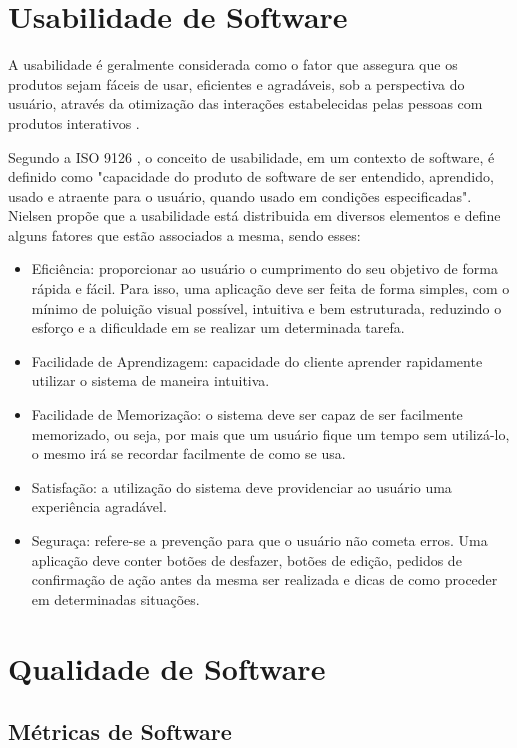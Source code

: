 \section{Usabilidade de Software}
A usabilidade é geralmente considerada como o fator que assegura que
os produtos sejam fáceis de usar, eficientes e agradáveis, sob a
perspectiva do usuário, através da otimização das interações
estabelecidas pelas pessoas com produtos interativos \cite{rogers_2013}.

Segundo a ISO 9126 \cite{iso9126}, o conceito de usabilidade, em um contexto de software, é definido como "capacidade do produto de software de ser entendido, aprendido, usado e atraente para o usuário, quando usado em condições especificadas". Nielsen \cite{nielsen_1994} propõe que a usabilidade está distribuida em diversos elementos e define alguns fatores que estão associados a mesma, sendo esses:

\begin{itemize}
    \item Eficiência: proporcionar ao usuário o cumprimento do seu objetivo de forma rápida e fácil. Para isso, uma aplicação deve ser feita de forma simples, com o mínimo de poluição visual possível, intuitiva e bem estruturada, reduzindo o esforço e a dificuldade em se realizar um determinada tarefa.
    \item Facilidade de Aprendizagem: capacidade do cliente aprender rapidamente utilizar o sistema de maneira intuitiva.
    \item Facilidade de Memorização: o sistema deve ser capaz de ser facilmente memorizado, ou seja, por mais que um usuário fique um tempo sem utilizá-lo, o mesmo irá se recordar facilmente de como se usa.
    \item Satisfação: a utilização do sistema deve providenciar ao usuário uma experiência agradável.
    \item Seguraça: refere-se a prevenção para que o usuário não cometa erros. Uma aplicação deve conter botões de desfazer, botões de edição, pedidos de confirmação de ação antes da mesma ser realizada e dicas de como proceder em determinadas situações.
\end{itemize}

\section{Qualidade de Software}

\subsection{Métricas de Software}

